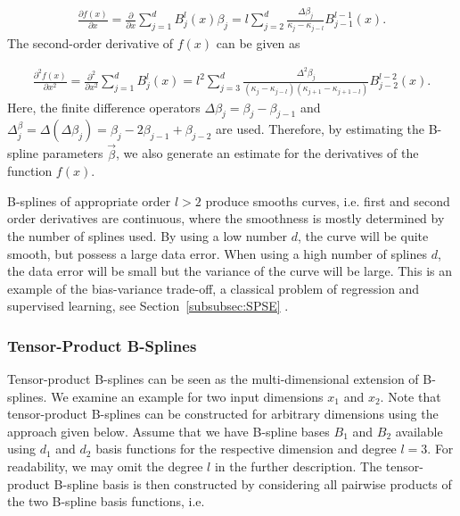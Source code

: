 \documentclass[10pt,a4paper]{report}
\begin{document}
\begin{align} \label{eq:Bspline-derivative}
	\frac{\partial{f(x)}}{\partial x}= \frac{\partial}{\partial x} \sum_{j=1}^d B_j^l(x) \beta_j = l \sum_{j=2}^d \frac{\Delta \beta_j}{\kappa_j - \kappa_{j-l}} B_{j-1}^{l-1}(x).
\end{align}
%
The second-order derivative of $f(x)$ can be given as

\begin{align} \label{eq:Bspline-2nd-derivative}
	\frac{\partial^2 {f(x)}}{\partial{x^2}}= \frac{\partial^2}{\partial{x^2}} \sum_{j=1}^d B_j^l(x) = l^2 \sum_{j=3}^d \frac{\Delta^2 \beta_j}{(\kappa_j-\kappa_{j-l})(\kappa_{j+1} - \kappa_{j+1-l})} B_{j-2}^{l-2}(x).
\end{align}
%
Here, the finite difference operators $\Delta \beta_j = \beta_j - \beta_{j-1}$ and $\Delta^ \beta_j = \Delta(\Delta \beta_j) = \beta_j - 2\beta_{j-1} +\beta_{j-2}$ are used. Therefore, by estimating the B-spline parameters $\vec{\beta}$, we also generate an estimate for the derivatives of the function $f(x)$. 

B-splines of appropriate order $l > 2$ produce smooths curves, i.e. first and second order derivatives are continuous, where the smoothness is mostly determined by the number of splines used. By using a low number $d$, the curve will be quite smooth, but possess a large data error. When using a high number of splines $d$, the data error will be small but the variance of the curve will be large. This is an example of the bias-variance trade-off, a classical problem of regression and supervised learning, see Section~\ref{subsubsec:SPSE}
\cite{deBoor1978practicalGuideToSplines}.  


\subsubsection{Tensor-Product B-Splines} \label{subsubsec:tp-splines}

Tensor-product B-splines can be seen as the multi-dimensional extension of B-splines. We examine an example for two input dimensions $x_1$ and $x_2$. Note that tensor-product B-splines can be constructed for arbitrary dimensions using the approach given below. Assume that we have B-spline bases $B_1$ and $B_2$ available using $d_1$ and $d_2$ basis functions for the respective dimension and degree $l=3$. For readability, we may omit the degree $l$ in the further description. The tensor-product B-spline basis is then constructed by considering all pairwise products of the two B-spline basis functions, i.e.
\end{document}
